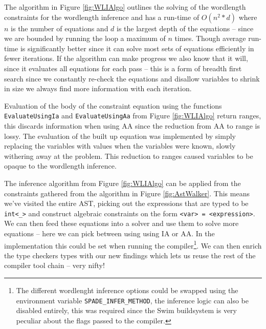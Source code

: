 The algorithm in Figure \ref{fig:WLIAlgo} outlines the solving of the wordlength constraints for the wordlength inference and has a run-time of $O(n^2*d)$ where $n$ is the number of equations and $d$ is the largest depth of the equations -- since we are bounded by running the loop a maximum of $n$ times. Though average run-time is significantly better since it can solve most sets of equations efficiently in fewer iterations. If the algorithm can make progress we also know that it will, since it evaluates all equations for each pass -- this is a form of breadth first search since we constantly re-check the equations and disallow variables to shrink in size we always find more information with each iteration.

Evaluation of the body of the constraint equation using the functions \verb+EvaluateUsingIa+ and \verb+EvaluateUsingAa+ from Figure \ref{fig:WLIAlgo} return ranges, this discards information when using AA since the reduction from AA to range is lossy. The evaluation of the built up equation was implemented by simply replacing the variables with values when the variables were known, slowly withering away at the problem. This reduction to ranges caused variables to be opaque to the wordlength inference.

The inference algorithm from Figure \ref{fig:WLIAlgo} can be applied from the constraints gathered from the algorithm in Figure \ref{fig:AstWalker}. This means we've visited the entire AST, picking out the expressions that are typed to be \verb+int<_>+ and construct algebraic constraints on the form \verb+<var> = <expression>+. We can then feed these equations into a solver and use them to solve more equations -- here we can pick between using using IA or AA. In the implementation this could be set when running the compiler\cprotect\footnote{The different wordlenght inference options could be swapped using the environment variable \verb+SPADE_INFER_METHOD+, the inference logic can also be disabled entirely, this was required since the Swim buildsystem is very peculiar about the flags passed to the compiler.}. We can then enrich the type checkers types with our new findings which lets us reuse the rest of the compiler tool chain -- very nifty!

